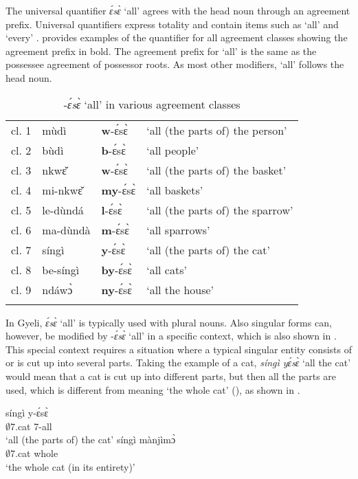 The universal quantifier {\itshape ɛ́sɛ̀}  `all' agrees with the head noun through an agreement prefix.  Universal quantifiers express totality and contain items such as `all' and `every' \citep[394]{zerbian2008}.  provides examples of the quantifier for all agreement classes showing the agreement prefix in bold. The agreement prefix for `all' is the same as the possessee agreement of possessor roots. As most other modifiers, `all' follows the head noun.

\begin{table}
\begin{tabularx}{\textwidth}{XXXl}
 \lsptoprule
cl. 1 & mùdì & {\bfseries w}-ɛ́sɛ̀ & `all (the parts of) the person' \\
cl. 2 & bùdì & {\bfseries b}-ɛ́sɛ̀ & `all people' \\
cl. 3 & nkwɛ̌ & {\bfseries w}-ɛ́sɛ̀ & `all (the parts of) the basket' \\
cl. 4 & mi-nkwɛ̌ & {\bfseries my}-ɛ́sɛ̀ & `all baskets' \\
cl. 5 & le-dùndá & {\bfseries l}-ɛ́sɛ̀ & `all (the parts of) the sparrow' \\
cl. 6 & ma-dùndà & {\bfseries m}-ɛ́sɛ̀ & `all sparrows' \\
cl. 7 & síngì & {\bfseries y}-ɛ́sɛ̀ & `all (the parts of) the cat' \\
cl. 8 & be-síngì & {\bfseries by}-ɛ́sɛ̀ & `all cats' \\
cl. 9 & ndáwɔ̀ & {\bfseries ny}-ɛ́sɛ̀ & `all the house' \\
 \lspbottomrule
\end{tabularx}
\caption{{\AGR}-{\itshape ɛ́sɛ̀} `all' in various agreement classes}
\label{Tab:All}
\end{table}

In Gyeli, {\itshape ɛ́sɛ̀} `all' is typically used with plural nouns.  Also singular forms can, however, be modified by -{\itshape ɛ́sɛ̀} `all'  in a specific context, which is also shown in . This special context requires a situation where a typical singular entity consists of or is cut up into several parts. Taking the example of a cat, {\itshape síngì yɛ́sɛ̀} `all the cat' would mean that a cat is cut up into different parts, but then all the parts are used, which is different from meaning `the whole cat' (), as shown in .

\ea \label{allcat}
  \ea \label{allcat1}
 \gll  síngì y-ɛ́sɛ̀  \\
          $\emptyset$7.cat 7-all  \\
    \trans `all (the parts of) the cat'
\ex \label{allcat2}
  \gll    síngì mànjìmɔ̀ \\
              $\emptyset$7.cat whole \\
    \trans `the whole cat (in its entirety)'
\z
\z
















